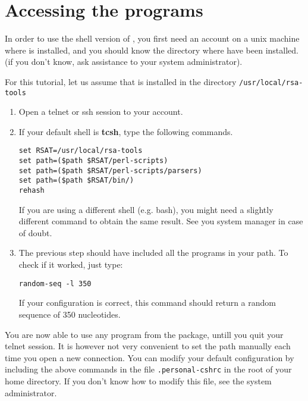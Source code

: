 
\section{Accessing the programs}

In order to use the shell version of \RSAT, you first need an account
on a unix machine where \RSAT is installed, and you should know the
directory where \RSAT have been installed. (if you don't know, ask
assistance to your system administrator).

For this tutorial, let us assume that \RSAT is installed in the
directory \texttt{/usr/local/rsa-tools}

\begin{enumerate}

\item Open a telnet or ssh session to your account.

\item If your default shell is \textbf{tcsh}, type the following
commands.

\begin{verbatim}
set RSAT=/usr/local/rsa-tools
set path=($path $RSAT/perl-scripts)
set path=($path $RSAT/perl-scripts/parsers)
set path=($path $RSAT/bin/)
rehash
\end{verbatim}

If you are using a different shell (e.g. bash), you might need a
slightly different command to obtain the same result. See you system
manager in case of doubt.

\item The previous step should have included all the \RSAT programs in
your path.  To check if it worked, just type:

\begin{verbatim}
random-seq -l 350
\end{verbatim}

If your configuration is correct, this command should return a random
sequence of 350 nucleotides.

\end{enumerate}

You are now able to use any program from the \RSAT package, untill you
quit your telnet session. It is however not very convenient to set the
path manually each time you open a new connection. You can modify your
default configuration by including the above commands in the file
\texttt{.personal-cshrc} in the root of your home directory. If you
don't know how to modify this file, see the system administrator.
